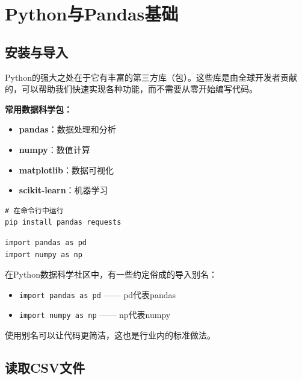 \documentclass[12pt,a4paper]{article}
\begin{document}
\section{Python与Pandas基础}

\subsection{安装与导入}

\begin{theorybox}[什么是Python包？]
Python的强大之处在于它有丰富的第三方库（包）。这些库是由全球开发者贡献的，可以帮助我们快速实现各种功能，而不需要从零开始编写代码。

\textbf{常用数据科学包：}
\begin{itemize}
    \item \textbf{pandas}：数据处理和分析
    \item \textbf{numpy}：数值计算
    \item \textbf{matplotlib}：数据可视化
    \item \textbf{scikit-learn}：机器学习
\end{itemize}
\end{theorybox}

\begin{lstlisting}[caption={安装Pandas}]
# 在命令行中运行
pip install pandas requests
\end{lstlisting}

\begin{lstlisting}[caption={导入Pandas}]
import pandas as pd
import numpy as np
\end{lstlisting}

\begin{tipbox}[导入别名约定]
在Python数据科学社区中，有一些约定俗成的导入别名：
\begin{itemize}
    \item \texttt{import pandas as pd} —— pd代表pandas
    \item \texttt{import numpy as np} —— np代表numpy
\end{itemize}
使用别名可以让代码更简洁，这也是行业内的标准做法。
\end{tipbox}

\subsection{读取CSV文件}
\end{document}
